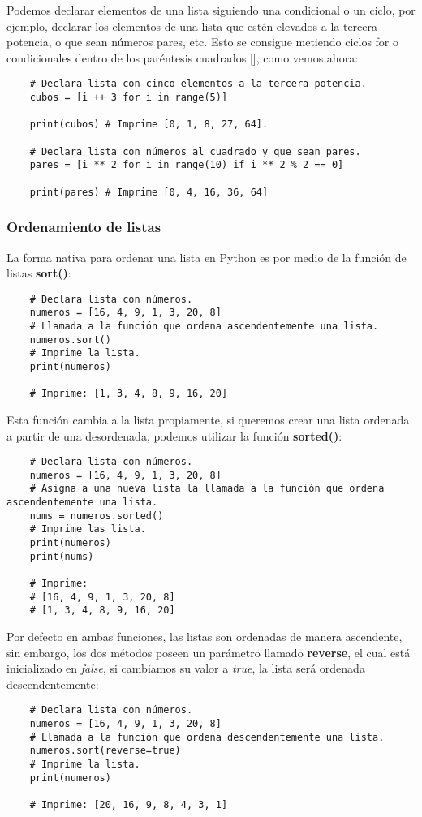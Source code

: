 Podemos declarar elementos de una lista siguiendo una condicional o un ciclo, por ejemplo, declarar los elementos de una lista que estén elevados a la tercera potencia, o que sean números pares, etc. Esto se consigue metiendo ciclos for o condicionales dentro de los paréntesis cuadrados [], como vemos ahora:
\begin{lstlisting}
    # Declara lista con cinco elementos a la tercera potencia.
    cubos = [i ++ 3 for i in range(5)]

    print(cubos) # Imprime [0, 1, 8, 27, 64].

    # Declara lista con números al cuadrado y que sean pares.
    pares = [i ** 2 for i in range(10) if i ** 2 % 2 == 0]

    print(pares) # Imprime [0, 4, 16, 36, 64]
\end{lstlisting}


\subsubsection{Ordenamiento de listas}

La forma nativa para ordenar una lista en Python es por medio de la función de listas \textbf{sort()}:
\begin{lstlisting}
    # Declara lista con números.
    numeros = [16, 4, 9, 1, 3, 20, 8]
    # Llamada a la función que ordena ascendentemente una lista.
    numeros.sort()
    # Imprime la lista.
    print(numeros)
	
    # Imprime: [1, 3, 4, 8, 9, 16, 20]
\end{lstlisting}

Esta función cambia a la lista propiamente, si queremos crear una lista ordenada a partir de una desordenada, podemos utilizar la función \textbf{sorted()}:
\begin{lstlisting}
    # Declara lista con números.
    numeros = [16, 4, 9, 1, 3, 20, 8]
    # Asigna a una nueva lista la llamada a la función que ordena ascendentemente una lista.
    nums = numeros.sorted()
    # Imprime las lista.
    print(numeros)
    print(nums)
	
    # Imprime:
    # [16, 4, 9, 1, 3, 20, 8]
    # [1, 3, 4, 8, 9, 16, 20]
\end{lstlisting}

Por defecto en ambas funciones, las listas son ordenadas de manera ascendente, sin embargo, los dos métodos poseen un parámetro llamado \textbf{reverse}, el cual está inicializado en \textit{false}, si cambiamos su valor a \textit{true}, la lista será ordenada descendentemente:
\begin{lstlisting}
    # Declara lista con números.
    numeros = [16, 4, 9, 1, 3, 20, 8]
    # Llamada a la función que ordena descendentemente una lista.
    numeros.sort(reverse=true)
    # Imprime la lista.
    print(numeros)
	
    # Imprime: [20, 16, 9, 8, 4, 3, 1]
\end{lstlisting}

